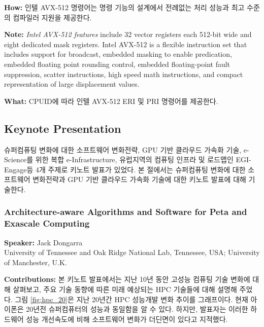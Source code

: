 \documentclass[twocolumn]{article}
\begin{document}
\noindent
\textbf{How:} 인텔 AVX-512 명령어는 명령 기능의 설계에서 전례없는 처리 성능과 최고 수준의 컴파일러 지원을 제공한다.

\noindent
\textbf{Note:} \textit{Intel AVX-512 features} include 32 vector registers each 512-bit wide and eight dedicated mask registers. Intel AVX-512 is a flexible instruction set that includes support for broadcast, embedded masking to enable predication, embedded floating point rounding control, embedded floating-point fault suppression, scatter instructions, high speed math instructions, and compact representation of large displacement values.

\noindent
\textbf{What:} CPUID에 따라 인텔 AVX-512 ERI 및 PRI 명령어를 제공한다.

\subsection{Keynote Presentation}
슈퍼컴퓨팅 변화에 대한 소프트웨어 변화전략, GPU 기반 클라우드 가속화 기술, e-Science를 위한 복합 e-Infrastructure, 유럽지역의 컴퓨팅 인프라 및 로드맵인  EGI-Engage등 4개 주제로 키노트 발표가 있었다. 본 절에서는 슈퍼컴퓨팅 변화에 대한 소프트웨어 변화전략과 GPU 기반 클라우드 가속화 기술에 대한 키노트 발표에 대해 기술한다.

\subsubsection{Architecture-aware Algorithms and Software for Peta and Exascale Computing}
\textbf{Speaker:} Jack Dongarra\\
University of Tennessee and Oak Ridge National Lab, Tennessee, USA; University of Manchester, U.K.

\noindent
\textbf{Contributions:} 본 키노트 발표에서는 지난 10년 동안 고성능 컴퓨팅 기술 변화에 대해 살펴보고, 주요 기술 동향에 따른 미래 예상되는 HPC 기술들에 대해 설명해 주었다. 그림 \ref{fig:hpc_20}은 지난 20년간 HPC 성능개발 변화 추이를 그래프이다. 현재 아이폰은 20년전 슈퍼컴퓨터의 성능과 동일함을 알 수 있다. 하지만, 발표자는 이러한 하드웨어 성능 개선속도에 비해 소프트웨어 변화가 더딘면이 있다고 지적했다.
\end{document}
